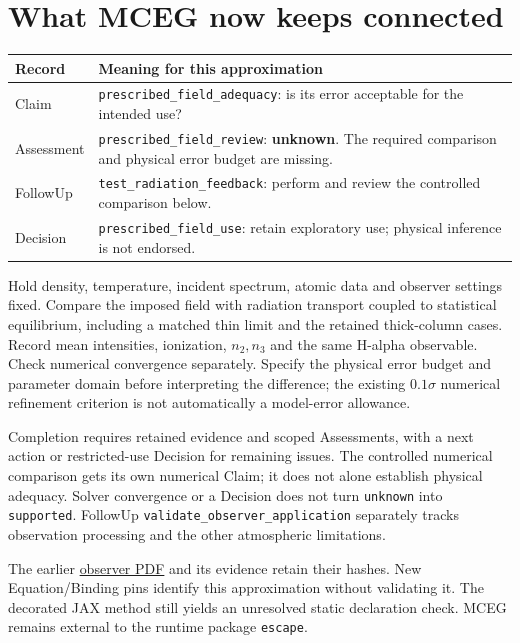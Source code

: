 \documentclass[10pt,a4paper]{article}
\begin{document}
\section{What MCEG now keeps connected}
\begin{tabularx}{\linewidth}{@{}lX@{}}
\toprule
Record & Meaning for this approximation \\
\midrule
Claim & \texttt{prescribed\_field\_adequacy}: is its error acceptable for the intended use? \\
Assessment & \texttt{prescribed\_field\_review}: \textbf{unknown}. The required comparison and physical error budget are missing. \\
FollowUp & \texttt{test\_radiation\_feedback}: perform and review the controlled comparison below. \\
Decision & \texttt{prescribed\_field\_use}: retain exploratory use; physical inference is not endorsed. \\
\bottomrule
\end{tabularx}

Hold density, temperature, incident spectrum, atomic data and observer settings
fixed. Compare the imposed field with radiation transport coupled to statistical
equilibrium, including a matched thin limit and the retained thick-column cases.
Record mean intensities, ionization, $n_2,n_3$ and the same H-alpha observable.
Check numerical convergence separately. Specify the physical error budget and
parameter domain before interpreting the difference; the existing $0.1\sigma$
numerical refinement criterion is not automatically a model-error allowance.

Completion requires retained evidence and scoped Assessments, with a next
action or restricted-use Decision for remaining issues. The controlled numerical
comparison gets its own numerical Claim; it does not alone establish physical
adequacy. Solver convergence or a Decision does not turn \texttt{unknown} into
\texttt{supported}. FollowUp \texttt{validate\_observer\_application} separately
tracks observation processing and the other atmospheric limitations.

The earlier \href{nlte_spectrum.pdf}{observer PDF} and its evidence retain their
hashes. New Equation/Binding pins identify this approximation without validating
it. The decorated JAX method still yields an unresolved static declaration
check. MCEG remains external to the runtime package \texttt{escape}.
\end{document}
